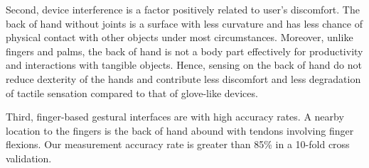 \documentclass{sigchi}
\begin{document}
Second, device interference is a factor positively related to user's discomfort. The back of hand without joints is a surface with less curvature and has less chance of physical contact with other objects under most circumstances. Moreover, unlike fingers and palms, the back of hand is not a body part effectively for productivity and interactions with tangible objects. Hence, sensing on the back of hand do not reduce dexterity of the hands and contribute less discomfort and less degradation of tactile sensation compared to that of glove-like devices.

Third, finger-based gestural interfaces are with high accuracy rates. A nearby location to the fingers is the back of hand abound with tendons involving finger flexions. Our measurement accuracy rate is greater than 85\% in a 10-fold cross validation.

 



\end{document}
